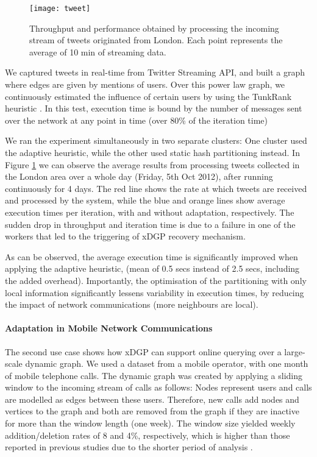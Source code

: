 \documentclass{sig-alternate-10pt}
\begin{document}
\begin{figure}
\centering
\texttt{[image: tweet]}
\vspace{-15pt}
\caption{Throughput and performance obtained by processing the incoming stream of tweets originated from London. Each point represents the average of 10 min of streaming data. }
\vspace{-15pt}
\label{fig:twitter}
\end{figure}


We captured tweets in real-time from Twitter Streaming API, and built a graph where edges are given by mentions of users. Over this power law graph, we continuously estimated the influence of certain users by using the TunkRank heuristic \cite{TunkRank2009}. In this test, execution time is bound by the number of messages sent over the network at any point in time (over 80\% of the iteration time)

We ran the experiment simultaneously in two separate clusters: One cluster used the adaptive heuristic, while the other used static hash partitioning instead. In Figure \ref{fig:twitter} we can observe the average results from processing tweets collected in the London area over a whole day (Friday, 5th Oct 2012), after running continuously for 4 days. The red line shows the rate at which tweets are received and processed by the system, while the blue and orange lines show average execution times per iteration, with and without adaptation, respectively. The sudden drop in throughput and iteration time is due to a failure in one of the workers that led to the triggering of xDGP recovery mechanism.

As can be observed, the average execution time is significantly improved when applying the adaptive heuristic, (mean of 0.5 secs instead of 2.5 secs, including the added overhead). Importantly, the optimisation of the partitioning with only local information significantly lessens variability in execution times, by reducing the impact of network communications (more neighbours are local).



\paragraph{\textbf{Adaptation in Mobile Network Communications}}

The second use case shows how xDGP can support online querying over a large-scale dynamic graph. We used a dataset from a mobile operator, with one month of mobile telephone calls. The dynamic graph was created by applying a sliding window to the incoming stream of calls as follows: Nodes represent users and calls are modelled as edges between these users. Therefore, new calls add nodes and vertices to the graph and both are removed from the graph if they are inactive for more than the window length (one week). The window size yielded weekly addition/deletion rates of 8 and 4\%, respectively, which is higher than those reported in previous studies due to the shorter period of analysis \cite{Cortes03computationalmethods}. 
\end{document}
